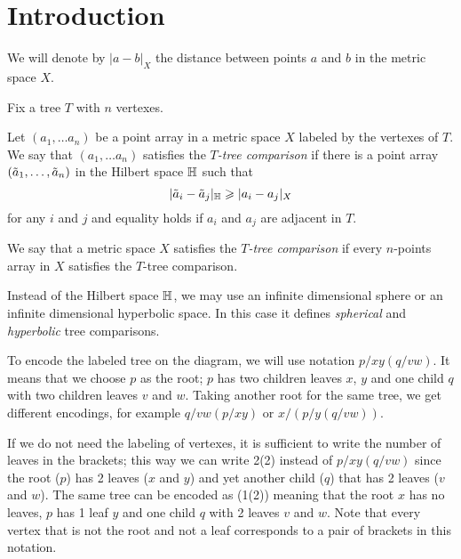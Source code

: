 \section{Introduction}\label{sec:intro}

We will denote by $|a-b|_X$ the distance between points $a$ and $b$ in the metric space $X$.

Fix a tree $T$ with $n$ vertexes.

Let $(a_1,\dots a_n)$ be a point array in a metric space $X$ labeled by the vertexes of $T$.
We say that $(a_1,\dots a_n)$  satisfies the \emph{$T$-tree comparison} if there is a point array $(\~a_1,\dots, \~a_n)$ in the Hilbert space $\HH$ such that 
\[|\~a_i-\~a_j|_\HH\ge|a_i-a_j|_X\]
for any $i$ and $j$ and equality holds if $a_i$ and $a_j$ are adjacent in $T$.

We say that a metric space $X$ satisfies the \emph{$T$-tree comparison} if 
every $n$-points array in $X$ satisfies the $T$-tree comparison.

Instead of the Hilbert space $\HH$, we may use an infinite dimensional sphere or an infinite dimensional hyperbolic space.
In this case it defines \emph{spherical} and \emph{hyperbolic} tree comparisons.

\begin{wrapfigure}{r}{27 mm}
\vskip-8mm
\end{wrapfigure}

To encode the labeled tree on the diagram, we will use notation $p/xy(q/vw)$.
It means that we choose $p$ as the root; 
$p$ has two children leaves $x$, $y$ and one child $q$ with two children leaves $v$ and $w$.
Taking another root for the same tree, we get different encodings, for example $q/vw(p/xy)$ or $x/(p/y(q/vw))$.

If we do not need the labeling of vertexes,
it is sufficient to write the number of leaves in the brackets;
this way we can write 2(2) instead of $p/xy(q/vw)$ since the root ($p$) has 2 leaves ($x$ and $y$) and yet another child ($q$) that has 2 leaves ($v$ and $w$).  
The same tree can be encoded as (1(2)) meaning that the root $x$ has no leaves, 
$p$ has 1 leaf $y$ and one child $q$ with 2 leaves $v$ and $w$.
Note that every vertex that is not the root and not a leaf corresponds to a pair of brackets in this notation.

